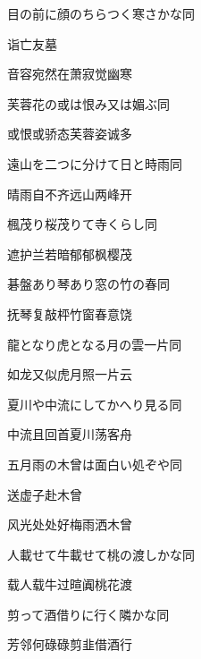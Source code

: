 \begin{haiku}
    {\FH 目の前に顔のちらつく寒さかな}\hfill{\FH 同}

    {\FK 诣亡友墓}

    {\FK 音容宛然在萧寂觉幽寒}
\end{haiku}

\begin{haiku}
    {\FH 芙蓉花の或は恨み又は媚ぶ}\hfill{\FH 同}

    {\FK 或恨或骄态芙蓉姿诚多}
\end{haiku}

\begin{haiku}
    {\FH 遠山を二つに分けて日と時雨}\hfill{\FH 同}

    {\FK 晴雨自不齐远山两峰开}
\end{haiku}

\begin{haiku}
    {\FH 楓茂り桜茂りて寺くらし}\hfill{\FH 同}

    {\FK 遮护兰若暗郁郁枫樱茂}
\end{haiku}

\begin{haiku}
    {\FH 碁盤あり琴あり窓の竹の春}\hfill{\FH 同}

    {\FK 抚琴复敲枰竹窗春意饶}
\end{haiku}

\begin{haiku}
    {\FH 龍となり虎となる月の雲一片}\hfill{\FH 同}

    {\FK 如龙又似虎月照一片云}
\end{haiku}

\begin{haiku}
    {\FH 夏川や中流にしてかへり見る}\hfill{\FH 同}

    {\FK 中流且回首夏川荡客舟}
\end{haiku}

\begin{haiku}
    {\FH 五月雨の木曾は面白い処ぞや}\hfill{\FH 同}

    {\FK 送虚子赴木曾}

    {\FK 风光处处好梅雨洒木曾}
\end{haiku}

\begin{haiku}
    {\FH 人載せて牛載せて桃の渡しかな}\hfill{\FH 同}

    {\FK 载人载牛过暄阗桃花渡}
\end{haiku}

\begin{haiku}
    {\FH {}剪って酒借りに行く隣かな}\hfill{\FH 同}

    {\FK 芳邻何碌碌剪韭借酒行}
\end{haiku}

